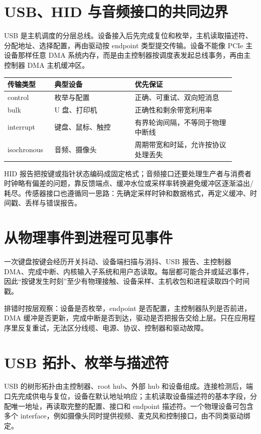 \section{USB、HID 与音频接口的共同边界}

USB 是主机调度的分层总线。设备接入后先完成复位和枚举，主机读取描述符、分配地址、选择配置，再由驱动按 endpoint 类型提交传输。设备不能像 PCIe 主设备那样任意 DMA 系统内存，而是由主控制器按调度表发起总线事务，再由主控制器 DMA 主机缓冲区。

\begin{longtable}{L{0.18\linewidth}L{0.32\linewidth}L{0.4\linewidth}}
\toprule
传输类型 & 典型设备 & 优先保证 \\
\midrule
control & 枚举与配置 & 正确、可重试、双向短消息 \\
bulk & U 盘、打印机 & 正确性和剩余带宽利用率 \\
interrupt & 键盘、鼠标、触控 & 有界轮询间隔，不等同于物理中断线 \\
isochronous & 音频、摄像头 & 周期带宽和时延，允许按协议处理丢失 \\
\bottomrule
\end{longtable}

HID 报告把按键或指针状态编码成固定格式；音频接口还要处理生产者与消费者时钟略有偏差的问题，靠反馈端点、缓冲水位或采样率转换避免缓冲区逐渐溢出/耗尽。传感器接口也遵循同一思路：先确定采样时钟和数据格式，再定义缓冲、时间戳、丢样与错误报告。

\section{从物理事件到进程可见事件}

一次键盘按键会经历开关抖动、设备端扫描与消抖、USB 报告、主控制器 DMA、完成中断、内核输入子系统和用户态读取。每层都可能合并或延迟事件，因此“按键发生时刻”至少有物理接触、设备采样、主机收包和进程读取四个时间戳。

排错时按层观察：设备是否枚举，endpoint 是否配置，主控制器队列是否前进，DMA 缓冲是否更新，完成中断是否到达，驱动是否把报告交给上层。只在应用程序里反复重试，无法区分线缆、电源、协议、控制器和驱动故障。

\section{USB 拓扑、枚举与描述符}

USB 的树形拓扑由主控制器、root hub、外部 hub 和设备组成。连接检测后，端口先完成供电与复位，设备在默认地址响应；主机读取设备描述符的基本字段，分配唯一地址，再读取完整的配置、接口和 endpoint 描述符。一个物理设备可包含多个 interface，例如摄像头同时提供视频、麦克风和控制接口，由不同类驱动绑定。

